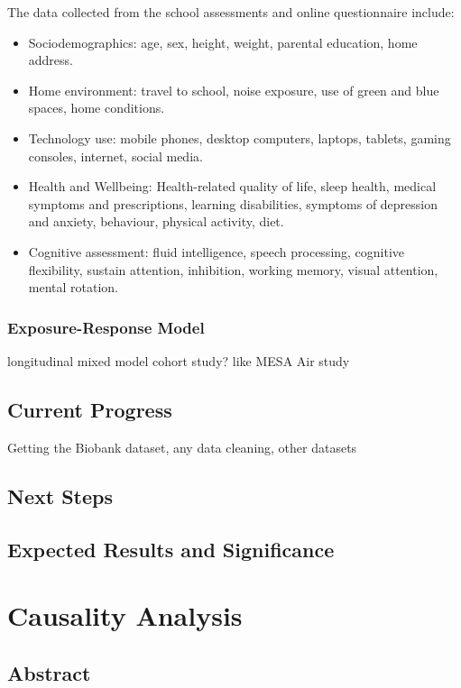 The data collected from the school assessments and online questionnaire include:
\begin{itemize}
    \item Sociodemographics: age, sex, height, weight, parental education, home address.
    \item Home environment: travel to school, noise exposure, use of green and blue spaces, home conditions.
    \item Technology use: mobile phones, desktop computers, laptops, tablets, gaming consoles, internet, social media.
    \item Health and Wellbeing: Health-related quality of life, sleep health, medical symptoms and prescriptions, learning disabilities, symptoms of depression and anxiety, behaviour, physical activity, diet.
    \item Cognitive assessment: fluid intelligence, speech processing, cognitive flexibility, sustain attention, inhibition, working memory, visual attention, mental rotation.
\end{itemize}


\subsubsection{Exposure-Response Model}
longitudinal mixed model cohort study? like MESA Air study

\subsection{Current Progress}
Getting the Biobank dataset, any data cleaning, other datasets

\subsection{Next Steps}

\subsection{Expected Results and Significance}

\section{Causality Analysis}
\subsection{Abstract}


